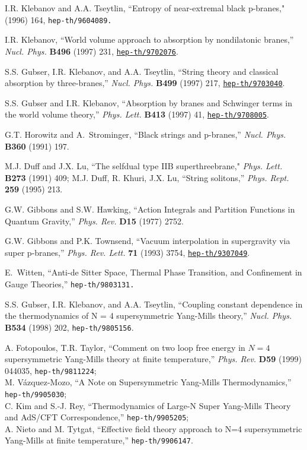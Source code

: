 \begin{thebibliography}{99}
I.R. Klebanov and A.A. Tseytlin, 
``Entropy of near-extremal black p-branes,"
 (1996) 164, {\tt hep-th/9604089.}

I.R. Klebanov, ``World volume approach to absorption by nondilatonic branes,''
  {\em Nucl. Phys.} {\bf B496} (1997) 231,
  \href{http://xxx.lanl.gov/abs/hep-th/9702076}{{\tt hep-th/9702076}}.

S.S. Gubser, I.R. Klebanov, and A.A. Tseytlin, ``String theory and classical
 \\  absorption by three-branes,'' {\em Nucl. Phys.} {\bf B499} (1997) 217,
  \href{http://xxx.lanl.gov/abs/hep-th/9703040}{{\tt hep-th/9703040}}.

S.S. Gubser and I.R. Klebanov, ``Absorption by branes and Schwinger terms in
  the world volume theory,'' {\em Phys. Lett.} {\bf B413} (1997) 41,
  \href{http://xxx.lanl.gov/abs/hep-th/9708005}{{\tt hep-th/9708005}}.

G.T. Horowitz and A.~Strominger, ``Black strings and p-branes,'' {\em Nucl.
  Phys.} {\bf B360} (1991) 197.


M.J. Duff  and J.X. Lu, 
``The selfdual  type IIB  superthreebrane,"
{\em Phys. Lett.}  {\bf B273} (1991)  409;
M.J. Duff, R. Khuri, J.X. Lu, ``String solitons,''
    {\em Phys. Rept.} {\bf 259} (1995) 213.

G.W. Gibbons and S.W. Hawking, ``Action Integrals and Partition Functions
in Quantum Gravity,'' {\em Phys. Rev.} {\bf D15} (1977) 2752.

G.W. Gibbons and P.K. Townsend, ``Vacuum interpolation in supergravity via
  super p-branes,'' {\em Phys. Rev. Lett.} {\bf 71} (1993) 3754,
  \href{http://xxx.lanl.gov/abs/hep-th/9307049}{{\tt hep-th/9307049}}.

E.~Witten, ``Anti-de Sitter Space, Thermal
Phase Transition, and Confinement in Gauge Theories,''
{\tt hep-th/9803131.}

S.S. Gubser, I.R. Klebanov, and A.A. Tseytlin,
``Coupling constant dependence in the thermodynamics
of {\cal N} = 4 supersymmetric Yang-Mills theory,''
{\em Nucl. Phys.} {\bf B534} (1998) 202, {{\tt hep-th/9805156}}.

A. Fotopoulos, T.R. Taylor, 
``Comment on two loop free energy in $N=4$ supersymmetric Yang-Mills
theory at finite temperature,'' {\em Phys. Rev.} {\bf D59} (1999)
044035, {\tt hep-th/9811224};\\
M. V\' azquez-Mozo, ``A Note on Supersymmetric Yang-Mills
Thermodynamics,'' {\tt hep-th/9905030};\\
C. Kim and S.-J. Rey, ``Thermodynamics of Large-N Super Yang-Mills
Theory and AdS/CFT Correspondence,''
{\tt hep-th/9905205};\\
A. Nieto and M. Tytgat, ``Effective field theory approach to N=4
supersymmetric Yang-Mills at finite temperature,''
{\tt hep-th/9906147}.



\end{thebibliography}
